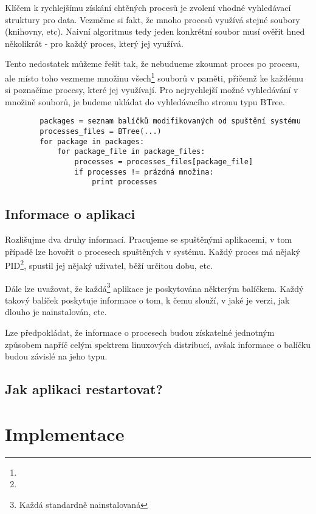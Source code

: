 \documentclass[10pt,a4paper]{article}
\begin{document}
		
		Klíčem k rychlejšímu získání chtěných procesů je zvolení vhodné vyhledávací struktury pro data. Vezměme si fakt, že mnoho procesů využívá stejné soubory (knihovny, etc). Naivní algoritmus tedy jeden konkrétní soubor musí ověřit hned několikrát - pro každý proces, který jej využívá.
		
		Tento nedostatek můžeme řešit tak, že nebudueme zkoumat proces po procesu, ale místo toho vezmeme množinu všech\footnote{} souborů v paměti, přičemž ke každému si poznačíme procesy, které jej využívají. Pro nejrychlejší možné vyhledávání v množině souborů, je budeme ukládat do vyhledávacího stromu typu BTree.
		
		\begin{verbatim}
		packages = seznam balíčků modifikovaných od spuštění systému
		processes_files = BTree(...)
		for package in packages:
			for package_file in package_files:
				processes = processes_files[package_file]
				if processes != prázdná množina:
					print processes		
		\end{verbatim}
		
		
		\subsection{Informace o aplikaci}
		Rozlišujme dva druhy informací. Pracujeme se spuštěnými aplikacemi, v tom případě lze hovořit o procesech spuštěných v systému. Každý proces má nějaký PID\footnote{}, spustil jej nějaký uživatel, běží určitou dobu, etc.
		
		Dále lze uvažovat, že každá\footnote{Každá standardně nainstalovaná} aplikace je poskytována některým balíčkem. Každý takový balíček poskytuje informace o tom, k čemu slouží, v jaké je verzi, jak dlouho je nainstalován, etc.
		
		Lze předpokládat, že informace o procesech budou získatelné jednotným způsobem napříč celým spektrem linuxových distribucí, avšak informace o balíčku budou závislé na jeho typu.
		
		\subsection{Jak aplikaci restartovat?} 
	
	\section{Implementace}
\end{document}
